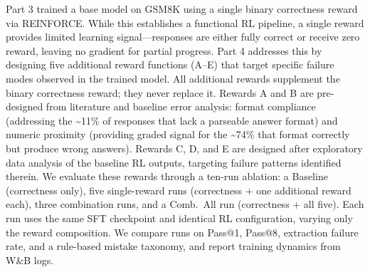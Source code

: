 Part 3 trained a base model on GSM8K using a single binary correctness reward via REINFORCE.
While this establishes a functional RL pipeline, a single reward provides limited learning signal---responses are either fully correct or receive zero reward, leaving no gradient for partial progress.
Part 4 addresses this by designing five additional reward functions (A--E) that target specific failure modes observed in the trained model.
All additional rewards supplement the binary correctness reward; they never replace it.
Rewards A and B are pre-designed from literature and baseline error analysis: format compliance (addressing the \textasciitilde11\% of responses that lack a parseable answer format) and numeric proximity (providing graded signal for the \textasciitilde74\% that format correctly but produce wrong answers).
Rewards C, D, and E are designed after exploratory data analysis of the baseline RL outputs, targeting failure patterns identified therein.
We evaluate these rewards through a ten-run ablation: a Baseline (correctness only), five single-reward runs (correctness + one additional reward each), three combination runs, and a Comb.\ All run (correctness + all five).
Each run uses the same SFT checkpoint and identical RL configuration, varying only the reward composition.
We compare runs on Pass@1, Pass@8, extraction failure rate, and a rule-based mistake taxonomy, and report training dynamics from W\&B logs.
